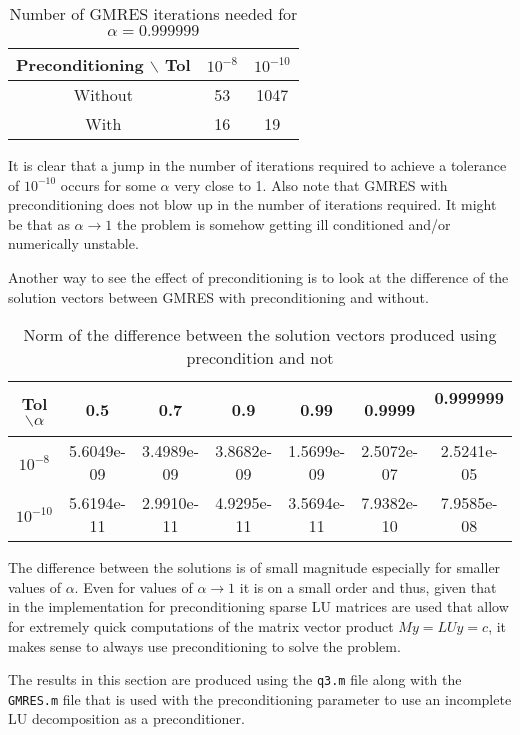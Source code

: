 \documentclass{article}
\begin{document}
\begin{enumerate}
	\begin{table}[h!]
		\centering
		\begin{tabular}{|c|c|c|}
			\hline
			 Preconditioning $ \backslash$ Tol & $10^{-8}$ & $10^{-10}$ \\
			\hline
			Without & 53 & 1047\\
   			With & 16 & 19\\
  			\hline
		\end{tabular}
	\caption{Number of GMRES iterations needed for $\alpha = 0.999999$}
	\end{table}
	
	It is clear that a jump in the number of iterations required to achieve a tolerance of $10^{-10}$ occurs for some $\alpha$ very close to 1. Also note that GMRES with preconditioning does not blow up in the number of iterations required. It might be that as $\alpha \rightarrow 1$ the problem is somehow getting ill conditioned and/or numerically unstable. 
	
	Another way to see the effect of preconditioning is to look at the difference of the solution vectors between GMRES with preconditioning and without.
	
	\begin{table}[h!]
	\centering
	\begin{tabular}{ | c | c | c | c| c | c | c | }
\hline
	Tol $\backslash \alpha$ & 0.5 & 0.7 & 0.9 & 0.99 & 0.9999 & 0.999999 \  \\ \hline
	$10^{-8}$ & 5.6049e-09 & 3.4989e-09 & 3.8682e-09 & 1.5699e-09 & 2.5072e-07 & 2.5241e-05 \\ \hline
	$10^{-10}$ & 5.6194e-11 & 2.9910e-11 & 4.9295e-11 & 3.5694e-11 & 7.9382e-10 & 7.9585e-08 \\ \hline
\end{tabular}
\caption{Norm of the difference between the solution vectors produced using precondition and not}
\end{table}

	The difference between the solutions is of small magnitude especially for smaller values of $\alpha$. Even for values of $\alpha \rightarrow 1$ it is on a small order and thus, given that in the implementation for preconditioning sparse LU matrices are used that allow for extremely quick computations of the matrix vector product $My = LUy = c$, it makes sense to always use preconditioning to solve the problem.
	
	The results in this section are produced using the \texttt{q3.m} file along with the \texttt{GMRES.m} file that is used with the preconditioning parameter to use an incomplete LU decomposition as a preconditioner.
	
\end{enumerate}
\end{document}
